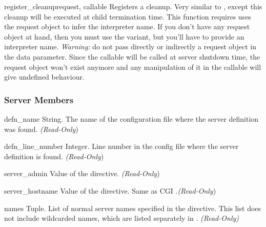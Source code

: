 \begin{methoddesc}[server]{register_cleanup}{request, callable}
  Registers a cleanup. Very similar to , except
  this cleanup will be executed at child termination time. This function
  requires uses the request object to infer the interpreter name.
  If you don't have any request object at hand, then you must use the
   variant, but you'll have to provide an
  interpreter name.
  \emph{Warning:} do not pass directly or indirectly a request object in the
  data parameter. Since the callable will be called at server shutdown time,
  the request object won't exist anymore and any manipulation of it in the
  callable will give undefined behaviour.
\end{methoddesc}

\subsubsection{Server Members\label{pyapi-mpsrv-mem}}

\begin{memberdesc}[server]{defn_name}
  String. The name of the configuration file where the server definition
  was found.
  \emph{(Read-Only})
\end{memberdesc}

\begin{memberdesc}[server]{defn_line_number}
  Integer. Line number in the config file where the server definition is
  found.
  \emph{(Read-Only})
\end{memberdesc}

\begin{memberdesc}[server]{server_admin}
  Value of the  directive. 
  \emph{(Read-Only})
\end{memberdesc}

\begin{memberdesc}[server]{server_hostname}
  Value of the  directive. Same as CGI .\emph{(Read-Only})
\end{memberdesc}

\begin{memberdesc}[server]{names}
  Tuple. List of normal server names specified in the  
  directive.  This list does not include wildcarded names, which are listed
  separately in . \emph{(Read-Only)}
\end{memberdesc}

